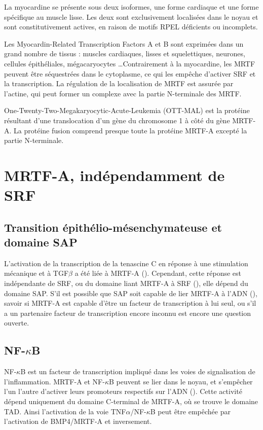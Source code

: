 \documentclass{report}
\begin{document}
La myocardine se présente sous deux isoformes, une forme cardiaque et une forme spécifique au muscle lisse. Les deux sont exclusivement localisées dans le noyau et sont constitutivement actives, en raison de motifs RPEL déficients ou incomplets. 

Les Myocardin-Related Transcription Factors A et B sont exprimées dans un grand nombre de tissus : muscles cardiaques, lisses et squelettiques, neurones, cellules épithéliales, mégacaryocytes \dots Contrairement à la myocardine, les MRTF peuvent être séquestrées dans le cytoplasme, ce qui les empêche d'activer SRF et la transcription. La régulation de la localisation de MRTF est assurée par l'actine, qui peut former un complexe avec la partie N-terminale des MRTF. 

One-Twenty-Two-Megakaryocytic-Acute-Leukemia (OTT-MAL) est la protéine résultant d'une translocation d'un gène du chromosome 1 à côté du gène MRTF-A. La protéine fusion comprend presque toute la protéine MRTF-A excepté la partie N-terminale. 


\section{MRTF-A, indépendamment de SRF}

\subsection{Transition épithélio-mésenchymateuse et domaine SAP}

L'activation de la transcription de la tenascine C en réponse à une stimulation mécanique et à TGF$\beta$ a été liée à MRTF-A (\cite{maier_tenascin-c_2008}). Cependant, cette réponse est indépendante de SRF, ou du domaine liant MRTF-A à SRF (\cite{asparuhova_transcriptional_2011}), elle dépend du domaine SAP. 
S'il est possible que SAP soit capable de lier MRTF-A à l'ADN (\cite{aravind_sapputative_2000}), savoir si MRTF-A est capable d'être un facteur de transcription à lui seul, ou s'il a un partenaire facteur de transcription encore inconnu est encore une question ouverte. 


\subsection{NF-$\kappa$B}

NF-$\kappa$B est un facteur de transcription impliqué dans les voies de signalisation de l'inflammation. MRTF-A et NF-$\kappa$B peuvent se lier dans le noyau, et s'empêcher l'un l'autre d'activer leurs promoteurs respectifs sur l'ADN (\cite{wang_bone_2012}). 
Cette activité dépend uniquement du domaine C-terminal de MRTF-A, où se trouve le domaine TAD. 
Ainsi l'activation de la voie TNF$\alpha$/NF-$\kappa$B peut être empêchée par l'activation de BMP4/MRTF-A et inversement. 
\end{document}
